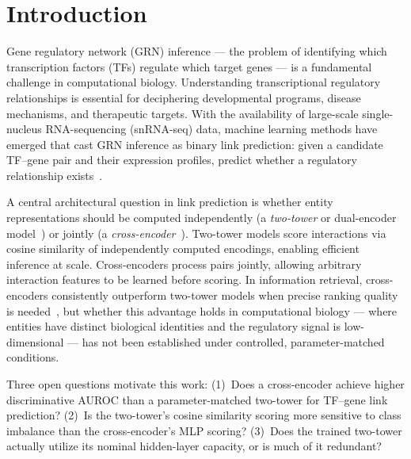 \documentclass[journal]{IEEEtran}
\begin{document}
\section{Introduction}
\label{sec:intro}

Gene regulatory network (GRN) inference --- the problem of identifying which
transcription factors (TFs) regulate which target genes --- is a fundamental
challenge in computational biology. Understanding transcriptional regulatory
relationships is essential for deciphering developmental programs, disease
mechanisms, and therapeutic targets. With the availability of large-scale
single-nucleus RNA-sequencing (snRNA-seq) data, machine learning methods have
emerged that cast GRN inference as binary link prediction: given a candidate
TF--gene pair and their expression profiles, predict whether a regulatory
relationship exists~\cite{aibar2017,huynh2010}.

A central architectural question in link prediction is whether entity
representations should be computed independently (a \emph{two-tower} or
dual-encoder model~\cite{huang2013,bromley1993}) or jointly (a
\emph{cross-encoder}~\cite{nogueira2019,humeau2020}). Two-tower models score
interactions via cosine similarity of independently computed encodings,
enabling efficient inference at scale. Cross-encoders process pairs jointly,
allowing arbitrary interaction features to be learned before scoring. In
information retrieval, cross-encoders consistently outperform two-tower models
when precise ranking quality is needed~\cite{nogueira2019,humeau2020}, but
whether this advantage holds in computational biology --- where entities have
distinct biological identities and the regulatory signal is low-dimensional ---
has not been established under controlled, parameter-matched conditions.

Three open questions motivate this work: (1)~Does a cross-encoder achieve
higher discriminative AUROC than a parameter-matched two-tower for TF--gene
link prediction? (2)~Is the two-tower's cosine similarity scoring more
sensitive to class imbalance than the cross-encoder's MLP scoring?
(3)~Does the trained two-tower actually utilize its nominal hidden-layer
capacity, or is much of it redundant?
\end{document}
